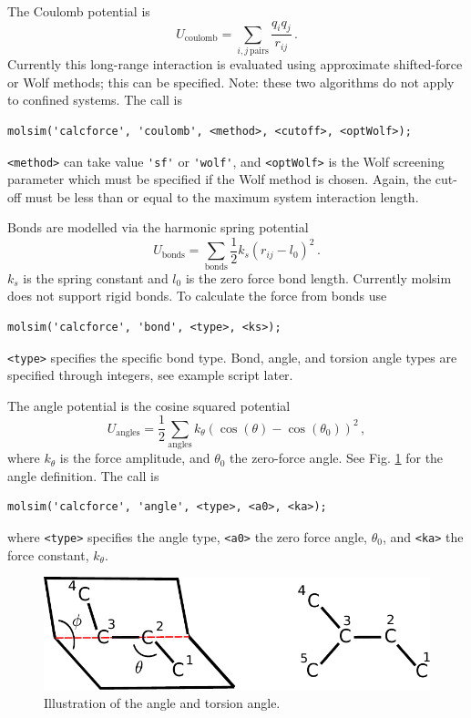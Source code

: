 \documentclass[11pt]{article}
\begin{document}
The Coulomb potential is 
\begin{equation}
  U_{\mathrm{coulomb}} = \sum_{i,j \, \mathrm{pairs}}\frac{q_iq_j}{r_{ij}} \, .
\end{equation}
Currently this long-range interaction is evaluated using approximate
shifted-force or Wolf methods; this can be specified. Note: these two
algorithms do not apply to confined systems. The call is
\begin{verbatim}
molsim('calcforce', 'coulomb', <method>, <cutoff>, <optWolf>);
\end{verbatim}
\verb!<method>! can take value \verb!'sf'! or \verb!'wolf'!, and
\verb!<optWolf>! is the Wolf screening parameter which must be specified if the
Wolf method is chosen. Again, the cut-off must be less than or equal to the
maximum system interaction length.

Bonds are modelled via the harmonic spring potential
\begin{equation}
  U_{\mathrm{bonds}} =\sum_{\mathrm{bonds}} \frac{1}{2} k_{s}(r_{ij} - l_0)^2 \, .
\end{equation}
$k_s$ is the spring constant and $l_0$ is the zero force bond length. 
Currently \textsf{molsim} does not support rigid bonds. To calculate the force
from bonds use
\begin{verbatim}
molsim('calcforce', 'bond', <type>, <ks>);
\end{verbatim} 
\verb!<type>! specifies the specific bond type. Bond, angle, and torsion angle
types are specified through integers, see example script later. 

The angle potential is the cosine squared potential
\begin{equation}
  U_{\mathrm{angles}}=\frac{1}{2}\sum_{\mathrm{angles}} k_{\theta} (\cos(\theta) - \cos(\theta_0))^2 \, ,
\end{equation}
where $k_\theta$ is the force amplitude, and $\theta_0$ the zero-force
angle. See Fig. \ref{fig:torsion} for the angle definition. The call is
\begin{verbatim}
molsim('calcforce', 'angle', <type>, <a0>, <ka>);
\end{verbatim}
where \verb!<type>! specifies the angle type, \verb!<a0>! the zero force angle,
$\theta_0$, and \verb!<ka>! the force constant, $k_\theta$.  
\begin{figure}[h]
  \begin{center}
    \includegraphics[scale=.7]{diheadral.pdf}
  \caption{
    \label{fig:torsion}
    Illustration of the angle and torsion angle.
  }
  \end{center}
\end{figure}
\end{document}
